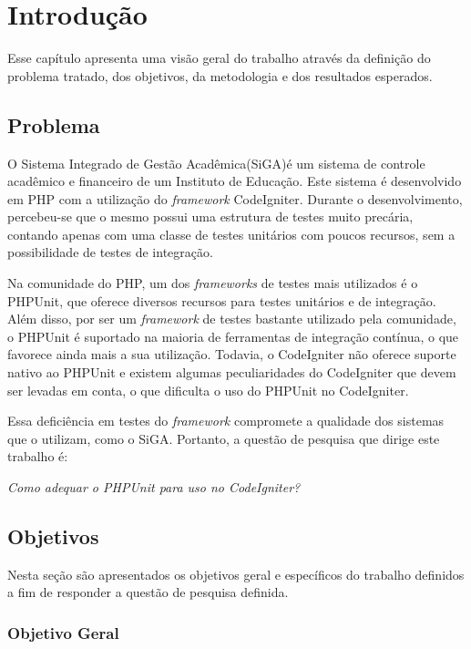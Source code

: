 \chapter[Introdução]{Introdução}

Esse capítulo apresenta uma visão geral do trabalho através da definição do problema tratado, dos objetivos, 
da metodologia e dos resultados esperados.

\section{Problema}

O Sistema Integrado de Gestão Acadêmica(SiGA)\footnotemark é um sistema de controle acadêmico e financeiro de um Instituto de Educação.
 Este sistema é desenvolvido em PHP com a utilização do \textit{framework}
CodeIgniter. 
Durante o desenvolvimento, percebeu-se que o mesmo possui uma estrutura de testes muito precária, contando
apenas com uma classe de testes unitários com poucos recursos, sem a possibilidade de testes de integração. 

Na comunidade do PHP, um dos \textit{frameworks} de testes mais utilizados é o PHPUnit, que oferece diversos recursos para testes unitários e de integração.
Além disso, por ser um \textit{framework} de testes bastante utilizado pela comunidade, o PHPUnit é suportado na maioria de ferramentas
de integração contínua, o que favorece ainda mais a sua utilização. Todavia, o CodeIgniter não oferece suporte nativo ao PHPUnit
e existem algumas peculiaridades do CodeIgniter que devem ser levadas em conta, o que dificulta o uso do PHPUnit no CodeIgniter.

Essa deficiência em testes do \textit{framework} compromete a qualidade dos sistemas que o utilizam,
como o SiGA. Portanto, a questão de pesquisa que dirige este trabalho é:

\textit{Como adequar o PHPUnit para uso no CodeIgniter?}
  
\section{Objetivos}

  Nesta seção são apresentados os objetivos geral e específicos do trabalho definidos a fim de responder a
  questão de pesquisa definida.

\subsection{Objetivo Geral}

